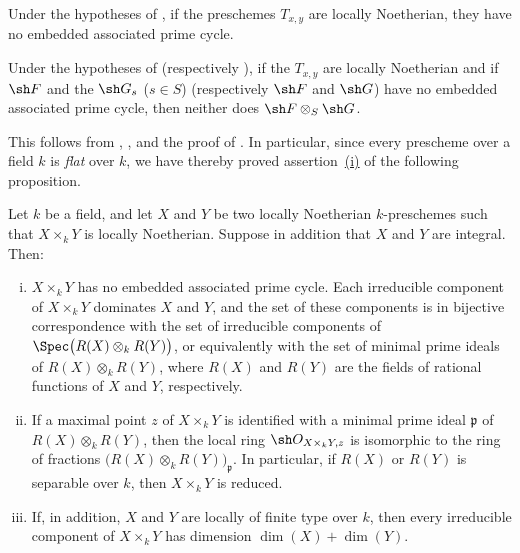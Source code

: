 \begin{corollary}[4.2.2]
\label{IV.4.2.2}
Under the hypotheses of , if the preschemes
$T_{x,y}$ are locally Noetherian, they have no embedded associated
prime cycle.
\end{corollary}

\begin{corollary}[4.2.3]
\label{IV.4.2.3}
Under the hypotheses of 
(respectively ), if the $T_{x,y}$ are locally Noetherian
and if $\sh F$ and the $\sh G_s$ \textup{(}$s\in S$\textup{)}
\textup{(respectively} $\sh F$ and $\sh G$\textup{)} have no embedded associated prime
cycle, then neither does $\sh F\otimes_S\sh G$.
\end{corollary}

This follows from , , and the proof of
.
In particular, since every prescheme over a field $k$ is \emph{flat} over $k$,
we have thereby proved assertion~{\hyperref[IV.4.2.4.i]{(i)}} of the
following proposition.

\begin{proposition}[4.2.4]
\label{IV.4.2.4}
Let $k$ be a field, and let $X$ and $Y$ be two locally Noetherian
$k$-preschemes such that $X\times_k Y$ is locally Noetherian.
Suppose in addition that $X$ and $Y$ are integral.
Then:
\begin{enumerate}[(i)]
\item[\textup{(i)}]
\label{IV.4.2.4.i}
$X\times_k Y$ has no embedded associated prime cycle.
Each irreducible component of $X\times_k Y$ dominates $X$ and $Y$, and
the set of these components is in bijective correspondence with the set
of irreducible components of $\Spec\bigl(R(X)\otimes_kR(Y)\bigr)$,
or equivalently with the set of minimal prime ideals of
$R(X)\otimes_kR(Y)$, where $R(X)$ and
$R(Y)$ are the fields of rational functions of $X$ and $Y$,
respectively.

\item[\textup{(ii)}]
\label{IV.4.2.4.ii}
If a maximal point $z$ of $X\times_k Y$ is identified with a minimal
prime ideal $\mathfrak p$ of
$R(X)\otimes_kR(Y)$, then the local ring $\sh O_{X\times_k Y,z}$
is isomorphic to the ring of fractions $\bigl(R(X)\otimes_kR(Y)\bigr)_{\mathfrak p}$.
In particular, if $R(X)$ or $R(Y)$ is separable over
$k$, then $X\times_k Y$ is reduced.


\item[\textup{(iii)}]
\label{IV.4.2.4.iii}
If, in addition, $X$ and $Y$ are locally of finite type over $k$, then
every irreducible component of $X\times_k Y$ has dimension $\dim(X)+\dim(Y)$.
\end{enumerate}
\end{proposition}

